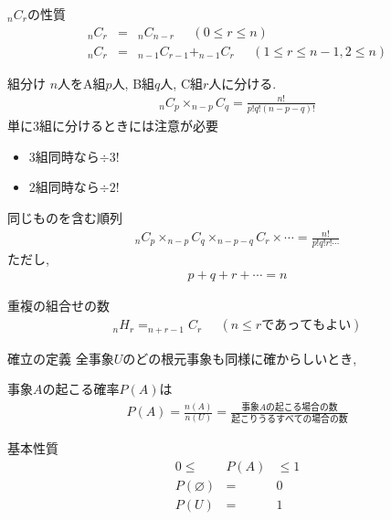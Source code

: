 \documentclass[aspectratio=169, 12pt]{beamer} %
\begin{document}
\begin{frame}{$_nC_r$の性質}
    \begin{eqnarray*}
        _nC_r&=& _nC_{n-r} \;\;\;\;\;(0\leq r \leq n) \\
        _nC_r&=&_{n-1}C_{r-1}+_{n-1}C_r \;\;\;\;\;(1\leq r \leq n-1, 2\leq n)
    \end{eqnarray*}
\end{frame}
\begin{frame}{組分け}
    $n$人をA組$p$人, B組$q$人, C組$r$人に分ける.
    \begin{eqnarray*}
        _nC_p\times _{n-p}C_q=\frac{n!}{p!q!(n-p-q)!}
    \end{eqnarray*}
    単に3組に分けるときには注意が必要
    \begin{itemize}
        \item 3組同時なら$\div 3!$
        \item 2組同時なら$\div 2!$
    \end{itemize}
\end{frame}
\begin{frame}{同じものを含む順列}
    \begin{eqnarray*}
        _nC_p\times _{n-p}C_{q}\times _{n-p-q}C_r \times \cdots = \frac{n!}{p!q!r!\cdots}
    \end{eqnarray*}
    ただし,
    \begin{eqnarray*}
        p+q+r+\cdots=n
    \end{eqnarray*}
\end{frame}
\begin{frame}{重複の組合せの数}
    \begin{eqnarray*}
        _nH_r=_{n+r-1}C_r\;\;\;\;\; (n\leq r であってもよい)
    \end{eqnarray*}
\end{frame}
\begin{frame}{確立の定義}
    全事象$U$のどの根元事象も同様に確からしいとき,\par
    事象$A$の起こる確率$P(A)$は
    \begin{eqnarray*}
        P(A)=\frac{n(A)}{n(U)}=\frac{事象Aの起こる場合の数}{起こりうるすべての場合の数}
    \end{eqnarray*}
\end{frame}
\begin{frame}{基本性質}
    \begin{eqnarray*}
        0 \leq &P(A)& \leq 1 \\
        P(\varnothing)&=&0 \\
        P(U)&=&1
    \end{eqnarray*}
\end{frame}
\end{document}
